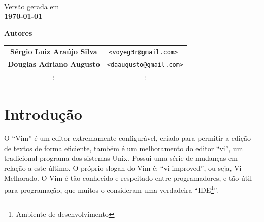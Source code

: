 \documentclass[10pt,a4paper,openany]{book}
\begin{document}
\begin{titlepage}
\begin{center}
\begin{flushright}
\begin{minipage}[t]{8cm}
	\end{minipage} \\
	\end{flushright}

	\vspace{3cm}

   {\small Versão gerada em \\ \bf \today}
\end{center}
\end{titlepage}

\newpage

\begin{center}
{\Huge \bf Autores}

\vspace{2cm}

\begin{tabular}{cc}

\bf Sérgio Luiz Araújo Silva & \tt <voyeg3r@gmail.com> \\
\bf Douglas Adriano Augusto & \tt <daaugusto@gmail.com>\\
$\vdots$ & $\vdots$ \\

\end{tabular}

\end{center}

\newpage
\tableofcontents

\chapter{Introdução}

O ``Vim'' é um editor extremamente configurável, criado para permitir a edição
de textos de forma eficiente, também é um melhoramento do editor ``vi'', um
tradicional programa dos sistemas Unix. Possui uma série de mudanças em relação
a este último. O próprio slogan do Vim é: ``vi improved'', ou seja, Vi Melhorado.  O Vim é
tão conhecido e respeitado entre programadores, e tão útil para programação,
que muitos o consideram uma verdadeira ``IDE\footnote{Ambiente de
desenvolvimento}''.
\end{document}
